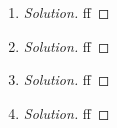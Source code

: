 \documentclass{article}
\begin{document}
\begin{enumerate}
	\item \begin{proof}[Solution]\let\qed\relax
		ff
	\end{proof}
	\item \begin{proof}[Solution]\let\qed\relax
		ff
	\end{proof}
	\item \begin{proof}[Solution]\let\qed\relax
		ff
	\end{proof}
	\item \begin{proof}[Solution]\let\qed\relax
		ff
	\end{proof}
\end{enumerate}
\clearpage
\end{document}
